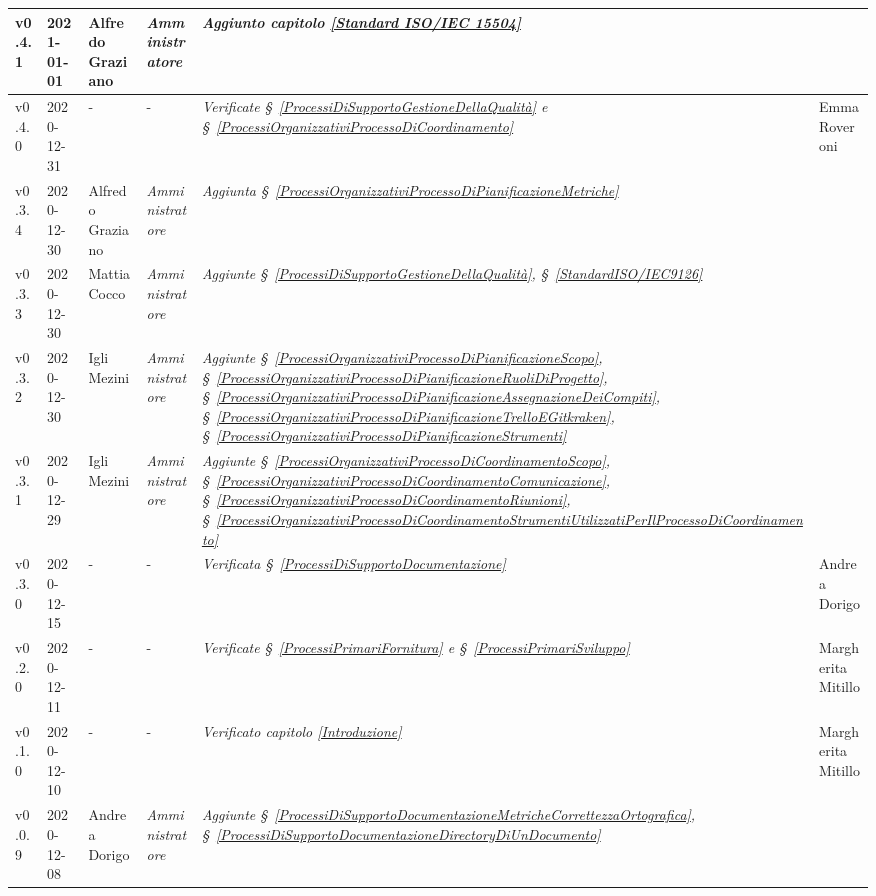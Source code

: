 {\begin{center}
\begin{longtable}[c]{|p{2cm-1\tabcolsep}|p{2cm}|p{3cm-2\tabcolsep}|p{3cm-1.5\tabcolsep}|p{}|p{3cm-2\tabcolsep}|}
		\hline
		\centering v0.4.1 & 2021-01-01 & Alfredo Graziano & \centering \textit{Amministratore}  & \textit{Aggiunto capitolo \ref{Standard ISO/IEC 15504}} &\makecell[c]{-} \\
		\hline
		\centering v0.4.0 & 2020-12-31 & \centering - & \centering -  & \textit{Verificate  \S~\ref{ProcessiDiSupportoGestioneDellaQualità} e \S~\ref{ProcessiOrganizzativiProcessoDiCoordinamento} } & Emma Roveroni \\
		\hline
		\centering v0.3.4 & 2020-12-30 & Alfredo Graziano & \centering \textit{Amministratore} &  \textit{Aggiunta  \S~\ref{ProcessiOrganizzativiProcessoDiPianificazioneMetriche}} & \makecell[c]{-} \\
		\hline
		\centering v0.3.3 & 2020-12-30 & Mattia Cocco & \centering \textit{Amministratore}  & \textit{Aggiunte  \S~\ref{ProcessiDiSupportoGestioneDellaQualità}, \S~\ref{StandardISO/IEC9126} }  & \makecell[c]{-}\\
		\hline
		\centering v0.3.2 & 2020-12-30 & Igli Mezini & \centering \textit{Amministratore}  & \textit{Aggiunte  \S~\ref{ProcessiOrganizzativiProcessoDiPianificazioneScopo}, \S~\ref{ProcessiOrganizzativiProcessoDiPianificazioneRuoliDiProgetto}, \S~\ref{ProcessiOrganizzativiProcessoDiPianificazioneAssegnazioneDeiCompiti}, \S~\ref{ProcessiOrganizzativiProcessoDiPianificazioneTrelloEGitkraken}, \S~\ref{ProcessiOrganizzativiProcessoDiPianificazioneStrumenti} } & \makecell[c]{-} \\
		\hline
		\centering v0.3.1 & 2020-12-29 & Igli Mezini & \centering \textit{Amministratore} &  \textit{Aggiunte  \S~\ref{ProcessiOrganizzativiProcessoDiCoordinamentoScopo}, \S~\ref{ProcessiOrganizzativiProcessoDiCoordinamentoComunicazione}, \S~\ref{ProcessiOrganizzativiProcessoDiCoordinamentoRiunioni}, \S~\ref{ProcessiOrganizzativiProcessoDiCoordinamentoStrumentiUtilizzatiPerIlProcessoDiCoordinamento} } & \makecell[c]{-} \\
		\hline
		\centering v0.3.0 & 2020-12-15 & \centering - & \centering -  & 
		\textit{Verificata  \S~\ref{ProcessiDiSupportoDocumentazione}} & Andrea Dorigo \\
		\hline
		\centering v0.2.0 & 2020-12-11 & \centering - & \centering -  & \textit{Verificate \S~\ref{ProcessiPrimariFornitura} e \S~\ref{ProcessiPrimariSviluppo} } & Margherita Mitillo \\
		\hline
		\centering v0.1.0 & 2020-12-10 & \centering - & \centering - & \textit{Verificato capitolo \ref{Introduzione}} & Margherita Mitillo  \\
		\hline
		\centering v0.0.9 & 2020-12-08 & Andrea Dorigo & \centering \textit{Amministratore} & \textit{Aggiunte  \S~\ref{ProcessiDiSupportoDocumentazioneMetricheCorrettezzaOrtografica}, \S~\ref{ProcessiDiSupportoDocumentazioneDirectoryDiUnDocumento}} & \makecell[c]{-}\\

\end{longtable}
\end{center}}
